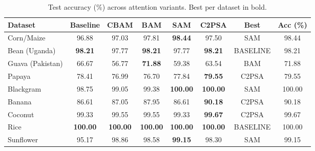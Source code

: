 \begin{table}[t]
\centering
\caption{Test accuracy (\%) across attention variants. Best per dataset in bold.}
\label{tab:results_summary}
\begin{tabular}{lccccc c c}
\toprule
\textbf{Dataset} & \textbf{Baseline} & \textbf{CBAM} & \textbf{BAM} & \textbf{SAM} & \textbf{C2PSA} & \textbf{Best} & \textbf{Acc (\%)}\\
\midrule
Corn/Maize & 96.88 & 97.03 & 97.81 & \textbf{98.44} & 97.50 & SAM & 98.44\\
Bean (Uganda) & \textbf{98.21} & 97.77 & \textbf{98.21} & 97.77 & \textbf{98.21} & BASELINE & 98.21\\
Guava (Pakistan) & 66.67 & 56.77 & \textbf{71.88} & 59.38 & 63.54 & BAM & 71.88\\
Papaya & 78.41 & 76.99 & 76.70 & 77.84 & \textbf{79.55} & C2PSA & 79.55\\
Blackgram & 98.75 & 99.05 & 99.38 & \textbf{100.00} & \textbf{100.00} & SAM & 100.00\\
Banana & 86.61 & 87.05 & 87.95 & 86.61 & \textbf{90.18} & C2PSA & 90.18\\
Coconut & 99.33 & 99.55 & 99.55 & 99.33 & \textbf{99.67} & C2PSA & 99.67\\
Rice & \textbf{100.00} & \textbf{100.00} & \textbf{100.00} & \textbf{100.00} & \textbf{100.00} & BASELINE & 100.00\\
Sunflower & 95.17 & 98.86 & 98.58 & \textbf{99.15} & 98.30 & SAM & 99.15\\
\bottomrule
\end{tabular}
\end{table}